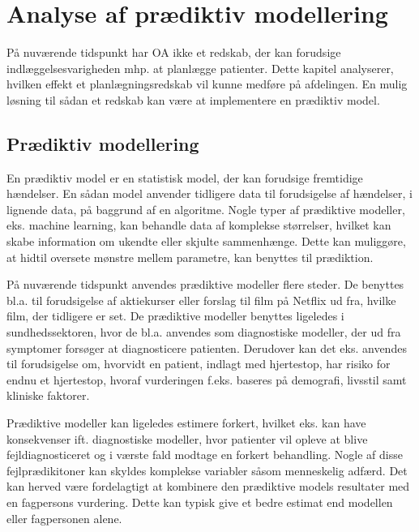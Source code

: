 \chapter{Analyse af prædiktiv modellering}
På nuværende tidspunkt har OA ikke et redskab, der kan forudsige indlæggelsesvarigheden mhp. at planlægge patienter. Dette kapitel analyserer, hvilken effekt et planlægningsredskab vil kunne medføre  på afdelingen. En mulig løsning til sådan et redskab kan være at implementere en prædiktiv model. 


\section{Prædiktiv modellering} \label{praemodel}
En prædiktiv model er en statistisk model, der kan forudsige fremtidige hændelser. En sådan model anvender tidligere data til forudsigelse af hændelser, i lignende data, på baggrund af en algoritme. Nogle typer af prædiktive modeller, eks. machine learning, kan behandle data af komplekse størrelser, hvilket kan skabe information om ukendte eller skjulte sammenhænge. Dette kan muliggøre, at hidtil oversete mønstre mellem parametre, kan benyttes til prædiktion.\cite{Kuhn2013}

På nuværende tidspunkt anvendes prædiktive modeller flere steder. De benyttes bl.a. til forudsigelse af aktiekurser eller forslag til film på Netflix ud fra, hvilke film, der tidligere er set.\cite{DIKU2010}
De prædiktive modeller benyttes ligeledes i sundhedssektoren, hvor de bl.a. anvendes som diagnostiske modeller, der ud fra symptomer forsøger at diagnosticere patienten.\cite{Kuhn2013} Derudover kan det eks. anvendes til forudsigelse om, hvorvidt en patient, indlagt med hjertestop, har risiko for endnu et hjertestop, hvoraf vurderingen f.eks. baseres på demografi, livsstil samt kliniske faktorer\cite{Hastie2008}. 

Prædiktive modeller kan ligeledes estimere forkert, hvilket eks. kan have konsekvenser ift. diagnostiske modeller, hvor patienter vil opleve at blive fejldiagnosticeret og i værste fald modtage en forkert behandling. Nogle af disse fejlprædikitoner kan skyldes komplekse variabler såsom menneskelig adfærd. Det kan herved være fordelagtigt at kombinere den prædiktive models resultater med en fagpersons vurdering. Dette kan typisk give et bedre estimat end modellen eller fagpersonen alene.\cite{Kuhn2013} 

